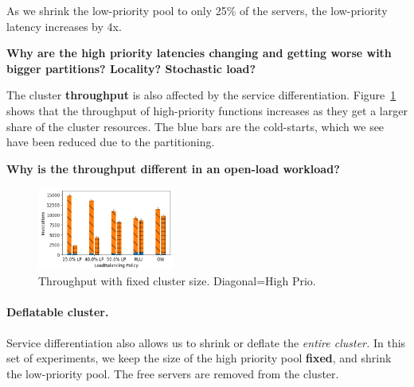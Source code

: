 As we shrink the low-priority pool to only 25\% of the servers, the low-priority latency increases by 4x.

\textbf{Why are the high priority latencies changing and getting worse with bigger partitions? Locality? Stochastic load?}



The cluster \textbf{throughput} is also affected by the service differentiation.
Figure~\ref{fig:fixed-tput} shows that the throughput of high-priority functions increases as they get a larger share of the cluster resources.
The blue bars are the cold-starts, which we see have been reduced due to the partitioning. 

\textbf{Why is the throughput different in an open-load workload?}


\begin{figure}
  \centering
  \includegraphics[width=0.4\textwidth]{../Figures/fixed/openload-throughputs.png}
  \caption[fixed-tput]{Throughput with fixed cluster size. Diagonal=High Prio.}
  \label{fig:fixed-tput}
\end{figure}


\paragraph{Deflatable cluster.}

Service differentiation also allows us to shrink or deflate the \emph{entire cluster.} In this set of experiments, we keep the size of the high priority pool \textbf{fixed}, and shrink the low-priority pool. The free servers are removed from the cluster. 


